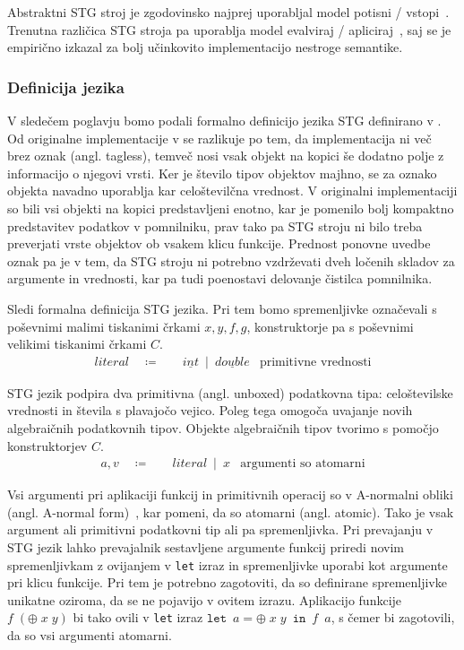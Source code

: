 Abstraktni STG stroj je zgodovinsko najprej uporabljal model potisni / vstopi~\cite{jones1992implementing}. Trenutna različica STG stroja pa uporablja model evalviraj / apliciraj~\cite{marlow2004making}, saj se je empirično izkazal za bolj učinkovito implementacijo nestroge semantike.

\subsubsection{Definicija jezika}

V sledečem poglavju bomo podali formalno definicijo jezika STG definirano v \cite{marlow2004making}. Od originalne implementacije v \cite{jones1992implementing} se razlikuje po tem, da implementacija ni več brez oznak (angl. tagless), temveč nosi vsak objekt na kopici še dodatno polje z informacijo o njegovi vrsti. Ker je število tipov objektov majhno, se za oznako objekta navadno uporablja kar celoštevilčna vrednost. V originalni implementaciji so bili vsi objekti na kopici predstavljeni enotno, kar je pomenilo bolj kompaktno predstavitev podatkov v pomnilniku, prav tako pa STG stroju ni bilo treba preverjati vrste objektov ob vsakem klicu funkcije. Prednost ponovne uvedbe oznak pa je v tem, da STG stroju ni potrebno vzdrževati dveh ločenih skladov za argumente in vrednosti, kar pa tudi poenostavi delovanje čistilca pomnilnika.

Sledi formalna definicija STG jezika. Pri tem bomo spremenljivke označevali s poševnimi malimi tiskanimi črkami $x, y, f, g$, konstruktorje pa s poševnimi velikimi tiskanimi črkami $C$.
\begin{align*}
	literal \quad \coloneq& \quad \underline{int} \enspace \vert \enspace \underline{double} & \text{primitivne vrednosti}
\end{align*}

STG jezik podpira dva primitivna (angl. unboxed) podatkovna tipa: celoštevilske vrednosti in števila s plavajočo vejico. Poleg tega omogoča uvajanje novih algebraičnih podatkovnih tipov. Objekte algebraičnih tipov tvorimo s pomočjo konstruktorjev $C$.
\begin{align*}
	a, v \quad \coloneq& \quad literal \enspace \vert \enspace x & \text{argumenti so atomarni}
\end{align*}

Vsi argumenti pri aplikaciji funkcij in primitivnih operacij so v A-normalni obliki (angl. A-normal form)~\cite{flanagan1993essence}, kar pomeni, da so atomarni (angl. atomic). Tako je vsak argument ali primitivni podatkovni tip ali pa spremenljivka. Pri prevajanju v STG jezik lahko prevajalnik sestavljene argumente funkcij priredi novim spremenljivkam z ovijanjem v \texttt{let} izraz in spremenljivke uporabi kot argumente pri klicu funkcije. Pri tem je potrebno zagotoviti, da so definirane spremenljivke unikatne oziroma, da se ne pojavijo v ovitem izrazu. Aplikacijo funkcije $f \; (\oplus \; x \; y)$ bi tako ovili v \texttt{let} izraz $\texttt{let} \enspace a = \oplus \; x \; y \enspace \texttt{in} \enspace f \enspace a$, s čemer bi zagotovili, da so vsi argumenti atomarni.

